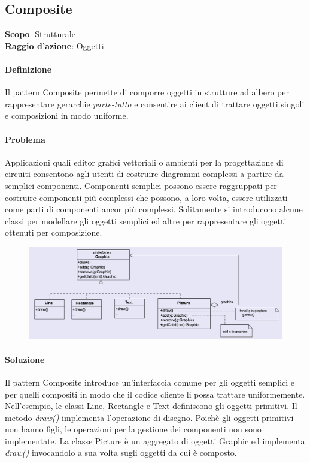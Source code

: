 \subsection{Composite}
\label{composite}

\textbf{Scopo}: Strutturale \\
\textbf{Raggio d'azione}: Oggetti

\paragraph{Definizione} Il pattern Composite permette di comporre oggetti in strutture ad albero per rappresentare gerarchie \textit{parte-tutto} e consentire ai client di trattare oggetti singoli e composizioni in modo uniforme.

\paragraph{Problema} Applicazioni quali editor grafici vettoriali o ambienti per la progettazione di circuiti consentono agli utenti di costruire diagrammi complessi a partire da semplici componenti. Componenti semplici possono essere raggruppati per costruire componenti più complessi che possono, a loro volta, essere utilizzati come parti di componenti ancor più complessi. Solitamente si introducono alcune classi per modellare gli oggetti semplici ed altre per rappresentare gli oggetti ottenuti per composizione.

\begin{figure}[H]
    \centering
    \includegraphics[width=0.8\linewidth]{assets/pattern/composite/composite-esempio.png}
\end{figure}

\paragraph{Soluzione} Il pattern Composite introduce un’interfaccia comune per gli oggetti semplici e per quelli compositi in modo che il codice cliente li possa trattare uniformemente. Nell’esempio, le classi Line, Rectangle e Text definiscono gli oggetti primitivi. Il metodo \textit{draw()} implementa l’operazione di disegno. Poichè gli oggetti primitivi non hanno figli, le operazioni per la gestione dei componenti non sono implementate. La classe Picture è un aggregato di oggetti Graphic ed implementa \textit{draw()} invocandolo a sua volta sugli oggetti da cui è composto.

